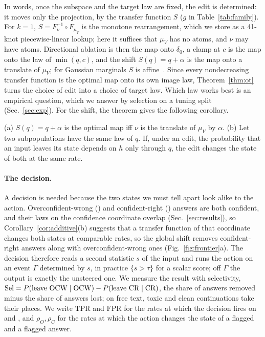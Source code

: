 In words, once the subspace and the target law are fixed, the edit is
determined: it moves only the projection, by the transfer function $S$ ($g$ in
Table~\ref{tab:family}). For $k=1$, $S=F_\nu^{-1}\circ F_{\mu_V}$ is the
monotone rearrangement, which we store as a 41-knot piecewise-linear lookup;
here it suffices that $\mu_V$ has no atoms, and $\nu$ may have atoms.
Directional ablation is then the map onto $\delta_0$, a clamp at $c$ is the map
onto the law of $\min(q,c)$, and the shift $S(q)=q+\alpha$ is the map onto a
translate of $\mu_V$; for Gaussian marginals $S$ is
affine~\citep{knott1984optimal,gelbrich1990formula}. Since every nondecreasing
transfer function is the optimal map onto its own image law,
Theorem~\ref{thm:ot} turns the choice of edit into a choice of target law.
Which law works best is an empirical question, which we answer by selection on
a tuning split (Sec.~\ref{sec:exp}). For the shift, the theorem gives the
following corollary.

\begin{corollary}
\label{cor:additive}
(a) $S(q)=q+\alpha$ is the optimal map iff $\nu$ is the translate of $\mu_V$
by $\alpha$.
(b) Let two subpopulations have the same law of $q$. If, under an edit, the
probability that an input leaves its state depends on $h$ only through $q$,
the edit changes the state of both at the same rate.
\end{corollary}

\paragraph{The decision.} A decision is needed because the two states we must
tell apart look alike to the action. Overconfident-wrong (\ocw{}) and
confident-right (\crok{}) answers are both confident, and their laws on the
confidence coordinate overlap (Sec.~\ref{sec:results}), so
Corollary~\ref{cor:additive}(b) suggests that a transfer function of that
coordinate changes both states at comparable rates, so the global shift
removes confident-right answers along with overconfident-wrong ones
(Fig.~\ref{fig:frontier}a). The decision therefore reads a second statistic
$s$ of the input and runs the action on an event $\Gamma$ determined by $s$, in
practice $\{s>\tau\}$ for a scalar score; off $\Gamma$ the output is exactly
the unsteered one. We measure the result with selectivity,
$\mathrm{Sel}=P(\text{leave OCW}\mid\text{OCW})-P(\text{leave CR}\mid\text{CR})$,
the share of \ocw{} answers removed minus the share of \crok{} answers lost; on
free text, toxic and clean continuations take their places. We write
$\mathrm{TPR}$ and $\mathrm{FPR}$ for the rates at which the decision fires on
\ocw{} and \crok{}, and $\rho_O,\rho_C$ for the rates at which the action
changes the state of a flagged \ocw{} and a flagged \crok{} answer.

